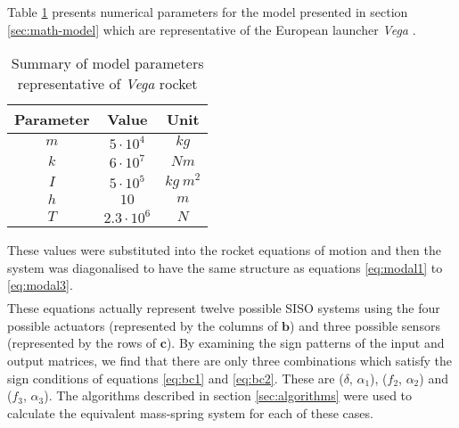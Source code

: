 \documentclass{mbd_fullpaper}
\begin{document}
Table \ref{tab:modelparam} presents numerical parameters for the model presented in section \ref{sec:math-model} which are representative of the European launcher \emph{Vega} \cite{}.
\renewcommand{\arraystretch}{1.5}
\begin{table}[!ht]
  \begin{center}
    \caption{Summary of model parameters representative of \emph{Vega} rocket \label{tab:modelparam}}
    \vspace{1mm}
    \begin{tabular}{ ccc }
	\hline
           Parameter & Value & Unit \\
	\hline
      	$m$ & $5 \cdot 10^4$ & $kg$\\
      	$k$ & $6 \cdot 10^7$ & $Nm$\\
      	$I$ & $5 \cdot 10^5$ & $kg~m^2$\\
      	$h$ & $10$ & $m$\\
      	$T$ & $2.3 \cdot 10^6$ & $N$\\
    \end{tabular}
  \end{center}
\end{table}
%
These values were substituted into the rocket equations of motion and then the system was diagonalised to have the same structure as equations \ref{eq:modal1} to \ref{eq:modal3}.
\begin{multline}

\label{eq:num_rock1}
\end{multline}
\begin{equation}

\label{eq:num_rock2}
\end{equation}
%
These equations actually represent twelve possible SISO systems using the four possible actuators (represented by the columns of $\mathbf{b}$) and three possible sensors (represented by the rows of $\mathbf{c}$).
By examining the sign patterns of the input and output matrices, we find that there are only three combinations which satisfy the sign conditions of equations \ref{eq:bc1} and \ref{eq:bc2}.
These are ($\delta$, $\alpha_1$), ($f_2$, $\alpha_2$) and ($f_3$, $\alpha_3$).
The algorithms described in section \ref{sec:algorithms} were used to calculate the equivalent mass-spring system for each of these cases.
\end{document}
